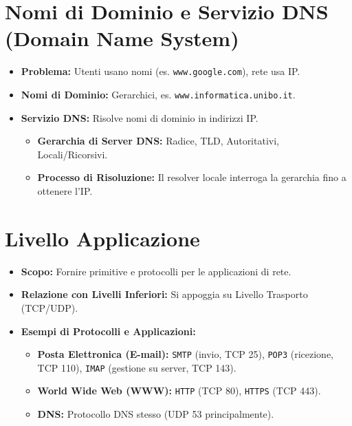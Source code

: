 \section{Nomi di Dominio e Servizio DNS (Domain Name System)}
\begin{itemize}
    \item \textbf{Problema:} Utenti usano nomi (es. \texttt{www.google.com}), rete usa IP.
    \item \textbf{Nomi di Dominio:} Gerarchici, es. \texttt{www.informatica.unibo.it}.
    \item \textbf{Servizio DNS:} Risolve nomi di dominio in indirizzi IP.
    \begin{itemize}
        \item \textbf{Gerarchia di Server DNS:} Radice, TLD, Autoritativi, Locali/Ricorsivi.
        \item \textbf{Processo di Risoluzione:} Il resolver locale interroga la gerarchia fino a ottenere l'IP.
    \end{itemize}
\end{itemize}

\section{Livello Applicazione}
\begin{itemize}
    \item \textbf{Scopo:} Fornire primitive e protocolli per le applicazioni di rete.
    \item \textbf{Relazione con Livelli Inferiori:} Si appoggia su Livello Trasporto (TCP/UDP).
    \item \textbf{Esempi di Protocolli e Applicazioni:}
    \begin{itemize}
        \item \textbf{Posta Elettronica (E-mail):} \texttt{SMTP} (invio, TCP 25), \texttt{POP3} (ricezione, TCP 110), \texttt{IMAP} (gestione su server, TCP 143).
        \item \textbf{World Wide Web (WWW):} \texttt{HTTP} (TCP 80), \texttt{HTTPS} (TCP 443).
        \item \textbf{DNS:} Protocollo DNS stesso (UDP 53 principalmente).
    \end{itemize}
\end{itemize}

